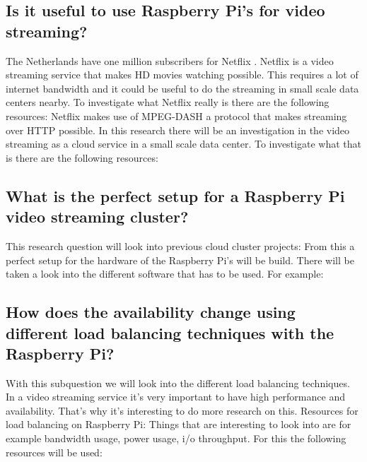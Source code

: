 \documentclass{sig-alternate-br}
\begin{document}
\subsection{Is it useful to use Raspberry Pi’s for video streaming?}
 The Netherlands have one million subscribers for Netflix \cite{volkskrant}. Netflix is a video streaming service that makes HD movies watching possible. This requires a lot of internet bandwidth and it could be useful to do the streaming in small scale data centers nearby. To investigate what Netflix really is there are the following resources:
\cite{volkskrant, Adhikari:2012} \newline
Netflix makes use of MPEG-DASH a protocol that makes streaming over HTTP possible. In this research there will be an investigation in the video streaming as a cloud service in a small scale data center. To investigate what that is there are the following resources:
\cite{raspberry-video,video-1080p, plissonneau:2012, computer-networking}

\subsection{What is the perfect setup for a Raspberry Pi video streaming cluster?}
This research question will look into previous cloud cluster projects: 
\cite{abrahamsson:2013,southampton, tso:2013, beloglazov:2010,cox:2014} \newline
From this a perfect setup for the hardware of the Raspberry Pi's will be build. There will be taken a look into the different software that has to be used. For example: 
\cite{raspberry-video,video-1080p, permission, nmon,bandwidth,ab} 

\subsection{How does the availability change using different load balancing techniques with the Raspberry Pi?}
With this subquestion we will look into the different load balancing techniques. In a video streaming service it's very important to have high performance and availability. That's why it's interesting to do more research on this. Resources for load balancing on Raspberry Pi:
\cite{nginx-load-balancing,nginx-load-balancing-2, nginx-load-balancing-3, Raspberry-media-server, dropbox-clone} \newline
Things that are interesting to look into are for example bandwidth usage, power usage, i/o throughput. For this the following resources will be used: 
\cite{nmon,bandwidth,ab}
\end{document}
